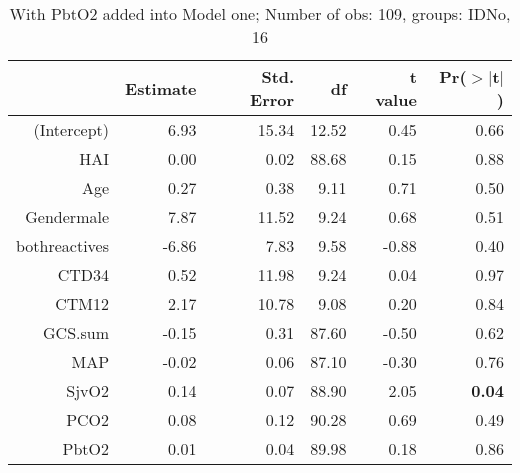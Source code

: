 \documentclass{article}
\begin{document}
\begin{table}[H]
\centering
\begin{tabular}{rrrrrr}
  \hline
 & Estimate & Std. Error & df & t value & Pr($>$$|$t$|$) \\ 
  \hline
(Intercept) & 6.93 & 15.34 & 12.52 & 0.45 & 0.66 \\ 
  HAI & 0.00 & 0.02 & 88.68 & 0.15 & 0.88 \\ 
  Age & 0.27 & 0.38 & 9.11 & 0.71 & 0.50 \\ 
  Gendermale & 7.87 & 11.52 & 9.24 & 0.68 & 0.51 \\ 
  bothreactives & -6.86 & 7.83 & 9.58 & -0.88 & 0.40 \\ 
  CTD34 & 0.52 & 11.98 & 9.24 & 0.04 & 0.97 \\ 
  CTM12 & 2.17 & 10.78 & 9.08 & 0.20 & 0.84 \\ 
  GCS.sum & -0.15 & 0.31 & 87.60 & -0.50 & 0.62 \\ 
  MAP & -0.02 & 0.06 & 87.10 & -0.30 & 0.76 \\ 
  SjvO2 & 0.14 & 0.07 & 88.90 & 2.05 & {\bf 0.04} \\ 
  PCO2 & 0.08 & 0.12 & 90.28 & 0.69 & 0.49 \\ 
  PbtO2 & 0.01 & 0.04 & 89.98 & 0.18 & 0.86 \\ 
   \hline
\end{tabular}
\caption{With PbtO2 added into Model one; Number of obs: 109, groups: IDNo, 16}
\label{tab: lmm2}
\end{table}
\end{document}
